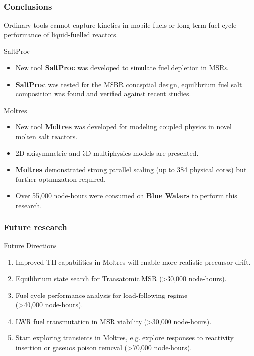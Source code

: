 \begin{frame}
  \frametitle{Conclusions}
  Ordinary tools cannot capture kinetics in mobile fuels or long term fuel 
        cycle performance of liquid-fuelled reactors. 
        \begin{block}{SaltProc}
        \begin{itemize}
                \item New tool \textbf{SaltProc} was developed to simulate fuel 
                        depletion in \glspl{MSR}.
                \item \textbf{SaltProc} was tested for the \gls{MSBR} conceptial design, equilibrium fuel salt composition was found and verified against recent studies.
		\end{itemize}
		\end{block}
		\begin{block}{Moltres}
		\begin{itemize}
		\item New tool \textbf{Moltres} was developed for modeling coupled physics in novel molten salt reactors.
		\item 2D-axisymmetric and 3D multiphysics models are presented.
		\item \textbf{Moltres} demonstrated strong parallel scaling (up to 384 physical cores) but further optimization required.
		\item Over 55,000 node-hours were consumed on \textbf{Blue Waters} to perform this research.
        \end{itemize}
        \end{block}
        
\end{frame}

\begin{frame}
  \frametitle{Future research}
         
              \begin{block}{Future Directions}
                 \begin{enumerate}
                 \item Improved TH capabilities in Moltres will enable more realistic precursor drift.
                \item Equilibrium state search for Transatomic \gls{MSR} (\textgreater 30,000 node-hours).
                \item Fuel cycle performance analysis for load-following regime \\ (\textgreater 40,000 node-hours).
                \item \gls{LWR} fuel transmutation in \gls{MSR} viability (\textgreater 30,000 node-hours).
		\vspace*{0.15in}
                \item Start exploring transients in Moltres, e.g. explore responses to reactivity insertion or gaseuos poison removal (\textgreater 70,000 node-hours).
               \end{enumerate}
               \end{block}
\end{frame}
